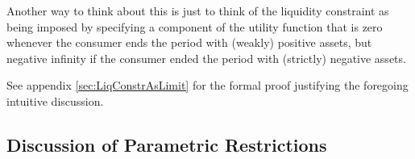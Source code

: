 \documentclass[BufferStockTheory]{subfiles}
\begin{document}
Another way to think about this is just to think of the liquidity
constraint as being imposed by specifying a component of the utility
function that is zero whenever the consumer ends the period with
(weakly) positive assets, but negative infinity if the consumer
ended the period with (strictly) negative assets.

See appendix \ref{sec:LiqConstrAsLimit} for the formal proof justifying the
foregoing intuitive discussion.

\hypertarget{Discussion-of-Parametric-Restrictions}{}
\subsection{Discussion of Parametric Restrictions}\label{sec:discussConvergence}

\begin{comment}
  \subsubsection{Perfect Foresight Case}

  The unconstrained perfect foresight model is the natural starting
  point for developing the intuition behind our parametric restrictions.
  As noted above, the Return Impatience Condition (\RIC) is necessary in
  this context to guarantee that the PDV of the stream of future
  consumption is finite; value is then given by
  \begin{align*}
    \vLevBF_{t}  & = \uFunc(\cLevBF_{t})+\DiscFac \uFunc(\overbrace{(\Rfree \DiscFac)^{1/\CRRA}\cLevBF_{t}}^{=\cLevBF_{t+1}})+\DiscFac^{2} \uFunc(((\Rfree \DiscFac)^{1/\CRRA})^{2}\cLevBF_{t})+...
    \\  & = \uFunc(\cLevBF_{t})\left(1+\DiscFac ((\Rfree \DiscFac)^{1/\CRRA})^{1-\CRRA}+(\DiscFac ((\Rfree \DiscFac)^{1/\CRRA})^{1-\CRRA})^{2}+...\right)
  \end{align*}
  which has a finite limit so long as $\DiscFac ((\Rfree \DiscFac)^{1/\CRRA})^{1-\CRRA} < 1$.  But
  \begin{align*}
    \DiscFac ({\Pat})^{1-\CRRA}   & = \DiscFac (\DiscFac \Rfree)^{1/\CRRA - 1}
    \\  & = {\Pat}/\Rfree = \PatR
  \end{align*}
  so the \RIC~guarantees the finiteness of value in addition to the PDV
  of consumption (given a finite starting point).

  The starting point for consumption is guaranteed to be finite by
  imposition of the finite human wealth (\FHWC) requirement.  (If human
  wealth were unbounded, our unconstrained consumer could freely borrow
  in order to spend an infinite amount in every period.)


\end{comment}
\end{document}

